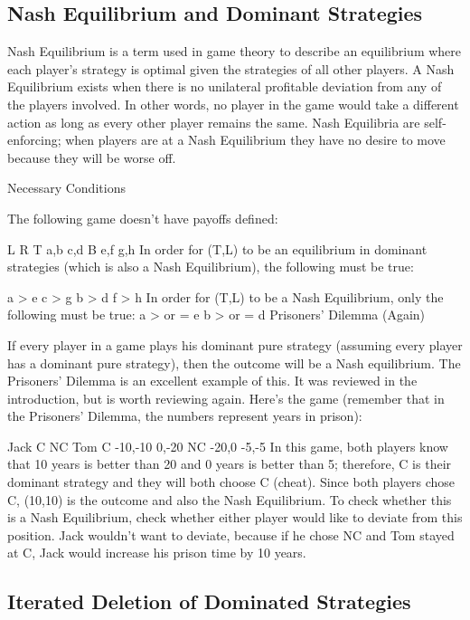 \subsection{Nash Equilibrium and Dominant Strategies}

Nash Equilibrium is a term used in game theory to describe an equilibrium where each player's strategy is optimal given the strategies of all other players. A Nash Equilibrium exists when there is no unilateral profitable deviation from any of the players involved. In other words, no player in the game would take a different action as long as every other player remains the same. Nash Equilibria are self-enforcing; when players are at a Nash Equilibrium they have no desire to move because they will be worse off.

Necessary Conditions

The following game doesn't have payoffs defined:

L	R
T	a,b	c,d
B	e,f	g,h
In order for (T,L) to be an equilibrium in dominant strategies (which is also a Nash Equilibrium), the following must be true:

a > e
c > g
b > d
f > h
In order for (T,L) to be a Nash Equilibrium, only the following must be true:
a > or = e
b > or = d
Prisoners' Dilemma (Again)

If every player in a game plays his dominant pure strategy (assuming every player has a dominant pure strategy), then the outcome will be a Nash equilibrium. The Prisoners' Dilemma is an excellent example of this. It was reviewed in the introduction, but is worth reviewing again. Here's the game (remember that in the Prisoners' Dilemma, the numbers represent years in prison):

Jack
C	NC
Tom	C	-10,-10	0,-20
NC	-20,0	-5,-5
In this game, both players know that 10 years is better than 20 and 0 years is better than 5; therefore, C is their dominant strategy and they will both choose C (cheat). Since both players chose C, (10,10) is the outcome and also the Nash Equilibrium. To check whether this is a Nash Equilibrium, check whether either player would like to deviate from this position. Jack wouldn't want to deviate, because if he chose NC and Tom stayed at C, Jack would increase his prison time by 10 years.

\subsection{Iterated Deletion of Dominated Strategies}

